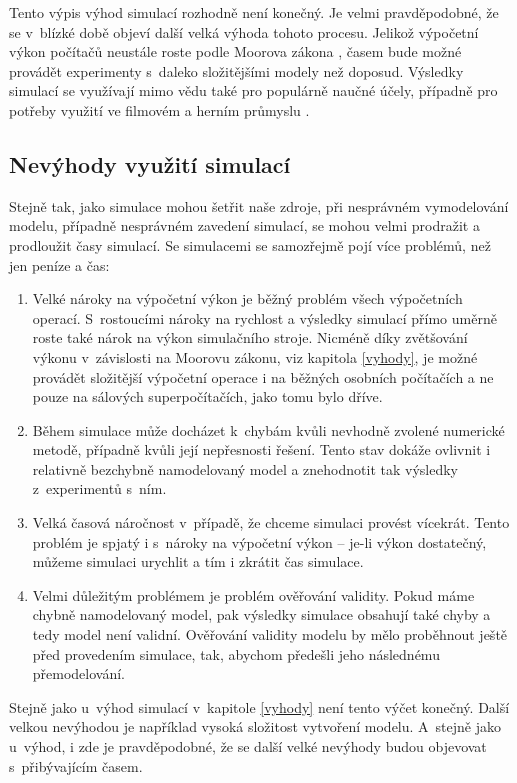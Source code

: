 Tento výpis výhod simulací rozhodně není konečný. Je velmi pravděpodobné, že se v~blízké době objeví další velká výhoda tohoto procesu. Jelikož výpočetní výkon počítačů neustále roste podle Moorova zákona \cite{Schaller1997}, časem bude možné provádět experimenty s~daleko složitějšími modely než doposud. Výsledky simulací se využívají mimo vědu také pro populárně naučné účely, případně pro potřeby využití ve filmovém a herním průmyslu \cite{James_2015}.

\subsection{Nevýhody využití simulací}

Stejně tak, jako simulace mohou šetřit naše zdroje, při nesprávném vymodelování modelu, případně nesprávném zavedení simulací, se mohou velmi prodražit a prodloužit časy simulací. Se simulacemi se samozřejmě pojí více problémů, než jen peníze a čas:

\begin{enumerate}
    \item Velké nároky na výpočetní výkon je běžný problém všech výpočetních operací. S~rostoucími nároky na rychlost a výsledky simulací přímo uměrně roste také nárok na výkon simulačního stroje. Nicméně díky zvětšování výkonu v~závislosti na Moorovu zákonu, viz kapitola \ref{vyhody}, je možné provádět složitější výpočetní operace i na běžných osobních počítačích a ne pouze na sálových superpočítačích, jako tomu bylo dříve.
    \item Během simulace může docházet k~chybám kvůli nevhodně zvolené numerické metodě, případně kvůli její nepřesnosti řešení. Tento stav dokáže ovlivnit i relativně bezchybně namodelovaný model a znehodnotit tak výsledky z~experimentů s~ním.
    \item Velká časová náročnost v~případě, že chceme simulaci provést vícekrát. Tento problém je spjatý i s~nároky na výpočetní výkon -- je-li výkon dostatečný, můžeme simulaci urychlit a tím i zkrátit čas simulace.
    \item Velmi důležitým problémem je problém ověřování validity. Pokud máme chybně namodelovaný model, pak výsledky simulace obsahují také chyby a tedy model není validní. Ověřování validity modelu by mělo proběhnout ještě před provedením simulace, tak, abychom předešli jeho následnému přemodelování.
\end{enumerate}

Stejně jako u~výhod simulací v~kapitole \ref{vyhody} není tento výčet konečný. Další velkou nevýhodou je například vysoká složitost vytvoření modelu. A~stejně jako u~výhod, i zde je pravděpodobné, že se další velké nevýhody budou objevovat s~přibývajícím časem.


